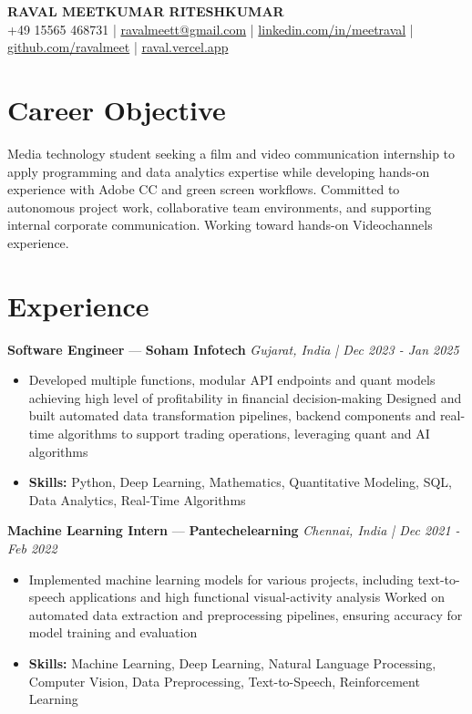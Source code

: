 \documentclass[a4paper,10pt]{article}
\begin{document}
\begin{center}
  {\Large\bfseries RAVAL MEETKUMAR RITESHKUMAR}\\[2pt]
  {\small +49 15565 468731 \;|\; \href{mailto:ravalmeett@gmail.com}{ravalmeett@gmail.com} \;|\; \href{https://www.linkedin.com/in/meetraval/}{linkedin.com/in/meetraval} \;|\; \href{https://github.com/ravalmeet}{github.com/ravalmeet} \;|\; \href{https://raval.vercel.app/}{raval.vercel.app}}
\end{center}
\vspace{-3pt}

\section*{Career Objective}
Media technology student seeking a film and video communication internship to apply programming and data analytics expertise while developing hands-on experience with Adobe CC and green screen workflows. Committed to autonomous project work, collaborative team environments, and supporting internal corporate communication. Working toward hands-on Videochannels experience.\par

\section*{Experience}
\textbf{Software Engineer} — \textbf{Soham Infotech} \hfill \textit{Gujarat, India \;|\; Dec 2023 - Jan 2025}\par
\vspace{1pt}
\begin{itemize}
  \item Developed multiple functions, modular API endpoints and quant models achieving high level of profitability in financial decision-making Designed and built automated data transformation pipelines, backend components and real-time algorithms to support trading operations, leveraging quant and AI algorithms
  \item \textbf{Skills:} Python, Deep Learning, Mathematics, Quantitative Modeling, SQL, Data Analytics, Real-Time Algorithms
\end{itemize}
\vspace{3pt}
\textbf{Machine Learning Intern} — \textbf{Pantechelearning} \hfill \textit{Chennai, India \;|\; Dec 2021 - Feb 2022}\par
\vspace{1pt}
\begin{itemize}
  \item Implemented machine learning models for various projects, including text-to-speech applications and high functional visual-activity analysis Worked on automated data extraction and preprocessing pipelines, ensuring accuracy for model training and evaluation
  \item \textbf{Skills:} Machine Learning, Deep Learning, Natural Language Processing, Computer Vision, Data Preprocessing, Text-to-Speech, Reinforcement Learning
\end{itemize}
\end{document}
